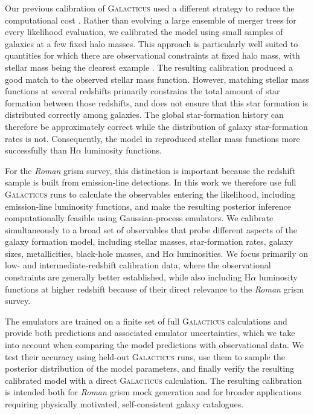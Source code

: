 \documentclass[twocolumn, apj, numberedappendix, iop]{openjournal}
\newcommand{\galacticus}{\textsc{Galacticus}\xspace}
\newcommand{\romanspace}{\textit{Roman}\xspace}
\newcommand{\ha}{H$\alpha$}
\begin{document}
Our previous calibration of \galacticus{} used a different strategy to reduce
the computational cost \citep{2026OJAp....955306R}. Rather than evolving a
large ensemble of merger trees for every likelihood evaluation, we calibrated
the model using small samples of galaxies at a few fixed halo masses. This
approach is particularly well suited to quantities for which there are
observational constraints at fixed halo mass, with stellar mass being the
clearest example
\citep[e.g. observationally inferred stellar-to-halo mass relations
from][]{2012ApJ...744..159L,2019MNRAS.488.3143B}. The resulting calibration
produced a good match to the observed stellar mass function. However, matching stellar mass functions at several redshifts primarily
constrains the total amount of star formation between those redshifts, and
does not ensure that this star formation is distributed correctly among
galaxies. The global star-formation history can therefore be approximately
correct while the distribution of galaxy star-formation rates is not.
Consequently, the model in \citet{2026OJAp....955306R} reproduced stellar
mass functions more successfully than \ha{} luminosity functions.

For the \romanspace{}  grism survey, this distinction is important because the redshift
sample is built from emission-line detections. In this work we therefore use
full \galacticus{} runs to calculate the observables entering the likelihood,
including emission-line luminosity functions, and make the resulting posterior
inference computationally feasible using Gaussian-process emulators. We
calibrate simultaneously to a broad set of observables that probe different
aspects of the galaxy formation model, including stellar masses, star-formation
rates, galaxy sizes, metallicities, black-hole masses, and \ha{} luminosities.
We focus primarily on low- and intermediate-redshift calibration data, where
the observational constraints are generally better established, while also
including \ha{} luminosity functions at higher redshift because of their direct
relevance to the \romanspace{}  grism survey.

The emulators are trained on a finite set of full \galacticus{} calculations
and provide both predictions and associated emulator uncertainties, which we take into account when comparing the model predictions with observational data. We test their accuracy using
held-out \galacticus{} runs, use them to sample the posterior distribution of
the model parameters, and finally verify the resulting calibrated model with a direct \galacticus{} calculation. The resulting calibration is intended both
for \romanspace{}  grism mock generation and for broader applications requiring
physically motivated, self-consistent galaxy catalogues.
\end{document}
